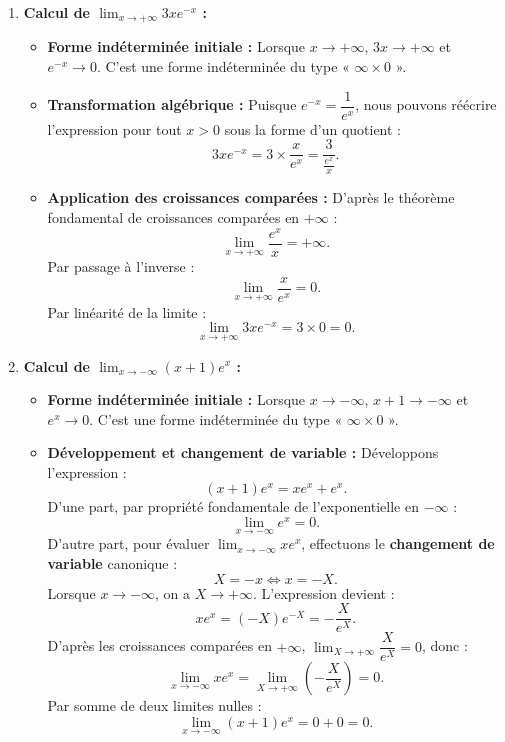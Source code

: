 \documentclass[11pt,a4paper]{article}
\begin{document}
\begin{correctionbox}[Exercice 10]
\begin{enumerate}[label=\textbf{\arabic*.}]
    \item \textbf{Calcul de $\lim_{x \to +\infty} 3x e^{-x}$ :}
    \begin{itemize}
        \item \textbf{Forme indéterminée initiale :} Lorsque $x \to +\infty$, $3x \to +\infty$ et $e^{-x} \to 0$. C'est une forme indéterminée du type « $\infty \times 0$ ».
        \item \textbf{Transformation algébrique :}
        Puisque $e^{-x} = \dfrac{1}{e^x}$, nous pouvons réécrire l'expression pour tout $x > 0$ sous la forme d'un quotient :
        \[
        3x e^{-x} = 3 \times \frac{x}{e^x} = \frac{3}{\frac{e^x}{x}}.
        \]
        \item \textbf{Application des croissances comparées :}
        D'après le théorème fondamental de croissances comparées en $+\infty$ :
        \[
        \lim_{x \to +\infty} \frac{e^x}{x} = +\infty.
        \]
        Par passage à l'inverse :
        \[
        \lim_{x \to +\infty} \frac{x}{e^x} = 0.
        \]
        Par linéarité de la limite :
        \[
        \boxed{\lim_{x \to +\infty} 3x e^{-x} = 3 \times 0 = 0}.
        \]
    \end{itemize}

    \item \textbf{Calcul de $\lim_{x \to -\infty} (x+1)e^x$ :}
    \begin{itemize}
        \item \textbf{Forme indéterminée initiale :} Lorsque $x \to -\infty$, $x+1 \to -\infty$ et $e^x \to 0$. C'est une forme indéterminée du type « $\infty \times 0$ ».
        \item \textbf{Développement et changement de variable :}
        Développons l'expression :
        \[
        (x+1)e^x = x e^x + e^x.
        \]
        D'une part, par propriété fondamentale de l'exponentielle en $-\infty$ :
        \[
        \lim_{x \to -\infty} e^x = 0.
        \]
        D'autre part, pour évaluer $\lim_{x \to -\infty} x e^x$, effectuons le \textbf{changement de variable} canonique :
        \[
        X = -x \iff x = -X.
        \]
        Lorsque $x \to -\infty$, on a $X \to +\infty$.
        L'expression devient :
        \[
        x e^x = (-X) e^{-X} = -\frac{X}{e^X}.
        \]
        D'après les croissances comparées en $+\infty$, $\lim_{X \to +\infty} \dfrac{X}{e^X} = 0$, donc :
        \[
        \lim_{x \to -\infty} x e^x = \lim_{X \to +\infty} \left(-\frac{X}{e^X}\right) = 0.
        \]
        Par somme de deux limites nulles :
        \[
        \boxed{\lim_{x \to -\infty} (x+1)e^x = 0 + 0 = 0}.
        \]
    \end{itemize}


\end{enumerate}
\end{correctionbox}
\end{document}
